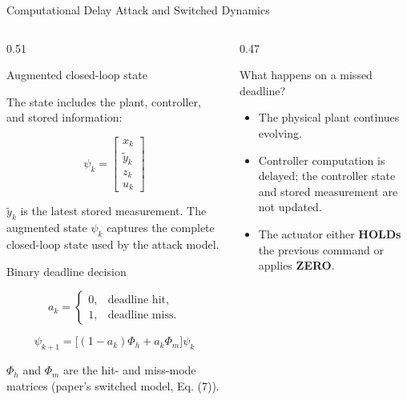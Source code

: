 \documentclass[9pt,aspectratio=169]{beamer}
\newcommand{\tightitemize}{
    \setlength{\itemsep}{1.5pt}
    \setlength{\parskip}{0pt}
    \setlength{\topsep}{2pt}
}
\begin{document}
\begin{frame}{Computational Delay Attack and Switched Dynamics}

\footnotesize

\begin{columns}[T,onlytextwidth]

\begin{column}{0.51\textwidth}

\begin{block}{Augmented closed-loop state}

The state includes the plant, controller, and stored information:

\[
\boxed{
\psi_k=
\begin{bmatrix}
x_k\\
\tilde y_k\\
z_k\\
u_k
\end{bmatrix}
}
\]

\vspace{-1mm}

\scriptsize
$\tilde y_k$ is the latest stored measurement.
The augmented state $\psi_k$ captures the complete
closed-loop state used by the attack model.

\end{block}

\begin{block}{Binary deadline decision}

\[
a_k=
\begin{cases}
0,&\text{deadline hit},\\
1,&\text{deadline miss}.
\end{cases}
\]

\[
\boxed{
\psi_{k+1}
=
\big[(1-a_k)\Phi_h+a_k\Phi_m\big]\psi_k
}
\]

\scriptsize
$\Phi_h$ and $\Phi_m$ are the hit- and miss-mode matrices
(paper's switched model, Eq. (7)).

\end{block}

\end{column}


\begin{column}{0.47\textwidth}

\begin{block}{What happens on a missed deadline?}

\begin{itemize}
\tightitemize
    \item The physical plant continues evolving.
    \item Controller computation is delayed; the controller
    state and stored measurement are not updated.
    \item The actuator either \textbf{HOLDs} the previous
    command or applies \textbf{ZERO}.
\end{itemize}


\end{block}
\end{column}
\end{columns}
\end{frame}
\end{document}

